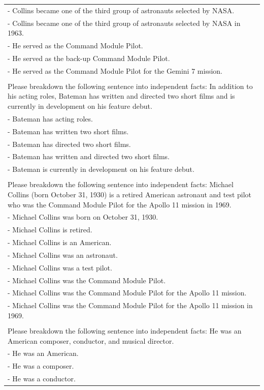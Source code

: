 \begin{table}[t]
\begin{tabular}{|p{}|}
- Collins became one of the third group of astronauts selected by NASA.\\
- Collins became one of the third group of astronauts selected by NASA in 1963.\\
- He served as the Command Module Pilot.\\
- He served as the back-up Command Module Pilot.\\
- He served as the Command Module Pilot for the Gemini 7 mission.\\
\\
Please breakdown the following sentence into independent facts: In addition to his acting roles, Bateman has written and directed two short films and is currently in development on his feature debut.\\
- Bateman has acting roles.\\
- Bateman has written two short films.\\
- Bateman has directed two short films.\\
- Bateman has written and directed two short films.\\
- Bateman is currently in development on his feature debut.\\
\\
Please breakdown the following sentence into independent facts: Michael Collins (born October 31, 1930) is a retired American astronaut and test pilot who was the Command Module Pilot for the Apollo 11 mission in 1969.\\
- Michael Collins was born on October 31, 1930.\\
- Michael Collins is retired.\\
- Michael Collins is an American.\\
- Michael Collins was an astronaut.\\
- Michael Collins was a test pilot.\\
- Michael Collins was the Command Module Pilot.\\
- Michael Collins was the Command Module Pilot for the Apollo 11 mission.\\
- Michael Collins was the Command Module Pilot for the Apollo 11 mission in 1969.\\
\\
Please breakdown the following sentence into independent facts: He was an American composer, conductor, and musical director.\\
- He was an American.\\
- He was a composer.\\
- He was a conductor.\\

\end{tabular}
\end{table}
